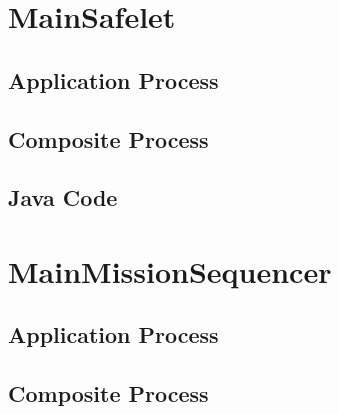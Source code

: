 \documentclass{article}
\begin{document}
\begin{circusbox}

\end{circusbox}

\newpage


\section{MainSafelet}

\subsection{Application Process}

\begin{circusbox}

\end{circusbox}

\subsection{Composite Process}

\begin{circusbox}

\end{circusbox}

\subsection{Java Code}



\section{MainMissionSequencer}

\subsection{Application Process}

\begin{circusbox}

\end{circusbox}

\subsection{Composite Process}
\end{document}
